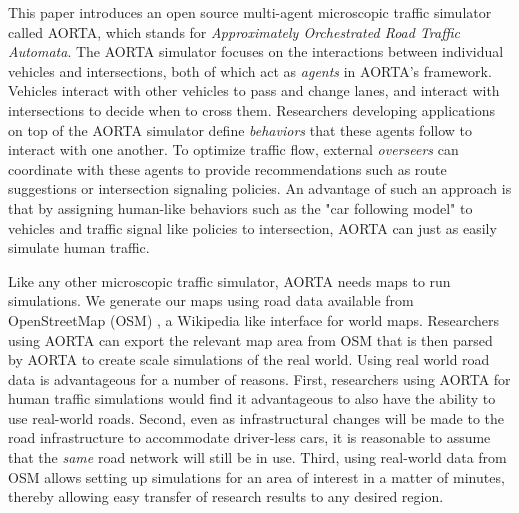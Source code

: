 \documentclass[letterpaper, 10 pt, conference]{ieeeconf}  %
\begin{document}
This paper introduces an open source multi-agent microscopic traffic simulator called AORTA, which stands for \textit{Approximately Orchestrated Road Traffic Automata}. The AORTA simulator focuses on the interactions between individual vehicles and intersections, both of which act as \textit{agents} in AORTA's framework. Vehicles interact with other vehicles to pass and change lanes, and interact with intersections to decide when to cross them. Researchers developing applications on top of the AORTA simulator define \textit{behaviors} that these agents follow to interact with one another. To optimize traffic flow, external \textit{overseers} can coordinate with these agents to provide recommendations such as route suggestions or intersection signaling policies. An advantage of such an approach is that by assigning human-like behaviors such as the "car following model" \cite{brackstone1999car} to vehicles and traffic signal like policies to intersection, AORTA can just as easily simulate human traffic.

Like any other microscopic traffic simulator, AORTA needs maps to run simulations. We generate our maps using road data available from OpenStreetMap (OSM) \cite{osm}, a Wikipedia like interface for world maps. Researchers using AORTA can export the relevant map area from OSM that is then parsed by AORTA to create scale simulations of the real world. Using real world road data is advantageous for a number of reasons. First, researchers using AORTA for human traffic simulations would find it advantageous to also have the ability to use real-world roads. Second, even as infrastructural changes will be made to the road infrastructure to accommodate driver-less cars, it is reasonable to assume that the \textit{same} road network will still be in use. Third, using real-world data from OSM allows setting up simulations for an area of interest in a matter of minutes, thereby allowing easy transfer of research results to any desired region.



\end{document}
